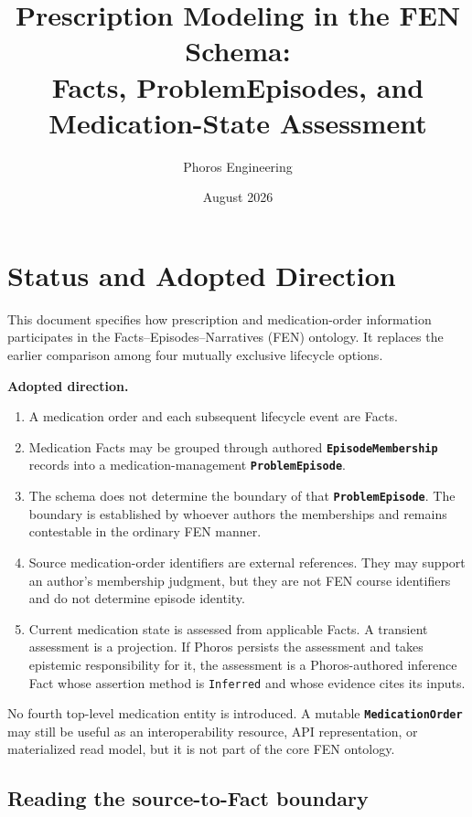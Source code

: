 \documentclass[11pt]{article}
\title{Prescription Modeling in the FEN Schema:\\
Facts, ProblemEpisodes, and Medication-State Assessment}
\author{Phoros Engineering}
\date{August 2026}
\newcommand{\entity}[1]{\texttt{\textbf{#1}}}
\newcommand{\field}[1]{\texttt{#1}}
\newenvironment{decisionbox}{%
  \begin{mdframed}[backgroundcolor=notegreen,
    linecolor=noteborder, linewidth=1pt,
    innertopmargin=8pt, innerbottommargin=8pt,
    innerleftmargin=10pt, innerrightmargin=10pt]
  \small
}{%
  \end{mdframed}
}
\begin{document}
\maketitle

\section{Status and Adopted Direction}

This document specifies how prescription and medication-order information
participates in the Facts--Episodes--Narratives (FEN) ontology. It replaces
the earlier comparison among four mutually exclusive lifecycle options.

\begin{decisionbox}
\textbf{Adopted direction.}

\begin{enumerate}[noitemsep]
  \item A medication order and each subsequent lifecycle event are Facts.
  \item Medication Facts may be grouped through authored
    \entity{EpisodeMembership} records into a medication-management
    \entity{ProblemEpisode}.
  \item The schema does not determine the boundary of that
    \entity{ProblemEpisode}. The boundary is established by whoever authors
    the memberships and remains contestable in the ordinary FEN manner.
  \item Source medication-order identifiers are external references. They
    may support an author's membership judgment, but they are not FEN course
    identifiers and do not determine episode identity.
  \item Current medication state is assessed from applicable Facts. A
    transient assessment is a projection. If Phoros persists the assessment
    and takes epistemic responsibility for it, the assessment is a
    Phoros-authored inference Fact whose assertion method is
    \field{Inferred} and whose evidence cites its inputs.
\end{enumerate}
\end{decisionbox}

No fourth top-level medication entity is introduced. A mutable
\entity{MedicationOrder} may still be useful as an interoperability resource,
API representation, or materialized read model, but it is not part of the
core FEN ontology.

\subsection{Reading the source-to-Fact boundary}
\end{document}
